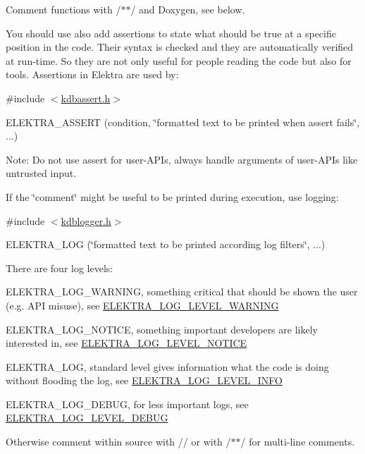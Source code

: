 \begin{DoxyEnumerate}
\item Comment functions with {\ttfamily /$\ast$$\ast$/} and Doxygen, see below.
\item You should use also add assertions to state what should be true at a specific position in the code. Their syntax is checked and they are automatically verified at run-\/time. So they are not only useful for people reading the code but also for tools. Assertions in Elektra are used by\+:

{\ttfamily \#include $<$\hyperlink{kdbassert_8h}{kdbassert.\+h}$>$}

{\ttfamily E\+L\+E\+K\+T\+R\+A\+\_\+\+A\+S\+S\+E\+R\+T (condition, \char`\"{}formatted text to be printed when assert fails\char`\"{}, ...)}

Note\+: Do not use assert for user-\/\+A\+P\+Is, always handle arguments of user-\/\+A\+P\+Is like untrusted input.
\item If the \char`\"{}comment\char`\"{} might be useful to be printed during execution, use logging\+:

{\ttfamily \#include $<$\hyperlink{kdblogger_8h}{kdblogger.\+h}$>$}

{\ttfamily E\+L\+E\+K\+T\+R\+A\+\_\+\+L\+O\+G (\char`\"{}formatted text to be printed according log filters\char`\"{}, ...)}

There are four log levels\+:
\begin{DoxyItemize}
\item E\+L\+E\+K\+T\+R\+A\+\_\+\+L\+O\+G\+\_\+\+W\+A\+R\+N\+I\+N\+G, something critical that should be shown the user (e.\+g. A\+P\+I misuse), see \hyperlink{kdblogger_8h_a4096a2ccd61c6f5ad60e9015fd1bbb4ba0524fff5c46e0cf07287c473c46cc8e2}{E\+L\+E\+K\+T\+R\+A\+\_\+\+L\+O\+G\+\_\+\+L\+E\+V\+E\+L\+\_\+\+W\+A\+R\+N\+I\+N\+G}
\item E\+L\+E\+K\+T\+R\+A\+\_\+\+L\+O\+G\+\_\+\+N\+O\+T\+I\+C\+E, something important developers are likely interested in, see \hyperlink{kdblogger_8h_a4096a2ccd61c6f5ad60e9015fd1bbb4ba329fc1e04c797ab8e54a137b21f41baf}{E\+L\+E\+K\+T\+R\+A\+\_\+\+L\+O\+G\+\_\+\+L\+E\+V\+E\+L\+\_\+\+N\+O\+T\+I\+C\+E}
\item E\+L\+E\+K\+T\+R\+A\+\_\+\+L\+O\+G, standard level gives information what the code is doing without flooding the log, see \hyperlink{kdblogger_8h_a4096a2ccd61c6f5ad60e9015fd1bbb4ba01618746c91d9d1090f599f604b9b832}{E\+L\+E\+K\+T\+R\+A\+\_\+\+L\+O\+G\+\_\+\+L\+E\+V\+E\+L\+\_\+\+I\+N\+F\+O}
\item E\+L\+E\+K\+T\+R\+A\+\_\+\+L\+O\+G\+\_\+\+D\+E\+B\+U\+G, for less important logs, see \hyperlink{kdblogger_8h_a4096a2ccd61c6f5ad60e9015fd1bbb4ba24c7a4c44a8b99b978dc99806d083386}{E\+L\+E\+K\+T\+R\+A\+\_\+\+L\+O\+G\+\_\+\+L\+E\+V\+E\+L\+\_\+\+D\+E\+B\+U\+G}
\end{DoxyItemize}
\item Otherwise comment within source with {\ttfamily //} or with {\ttfamily /$\ast$$\ast$/} for multi-\/line comments.
\end{DoxyEnumerate}

